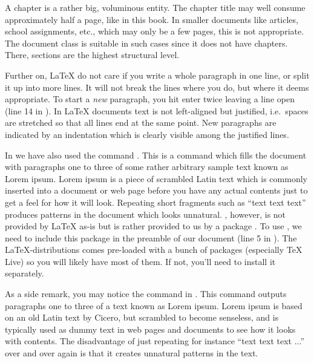 \begin{listing}
	\inputminted{latex}{latex/structure.tex}
	\caption{A \LaTeX{} document with some structure and text}
	\label{lst:latex:structure}
\end{listing}

A chapter is a rather big, voluminous entity. The chapter title may well consume approximately half a page, like in this book. In smaller documents like articles, school assignments, etc., which may only be a few pages, this is not appropriate. The   document class is suitable in such cases since it does not have chapters. There, sections are the highest structural level.

Further on, \LaTeX{} do not care if you write a whole paragraph in one line, or split it up into more lines. It will not break the lines where you do, but where it deems appropriate. To start a \emph{new} paragraph, you hit enter twice leaving a line open (line 14 in ). In \LaTeX{} documents text is not left-aligned but justified, i.e.\ spaces are stretched so that all lines end at the same point. New paragraphs are indicated by an indentation which is clearly visible among the justified lines.

In  we have also used the command \latexin{\lipsum[1-3]}. This is a command which fills the document with paragraphs one to three of some rather arbitrary sample text known as Lorem ipsum. Lorem ipsum is a piece of scrambled Latin text which is commonly inserted into a document or web page before you have any actual contents just to get a feel for how it will look. Repeating short fragments such as ``text text text'' produces patterns in the document which looks unnatural. \latexin{\lipsum}, however, is not provided by \LaTeX{} as-is but is rather provided to us by a package . To use \latexin{\lipsum}, we need to include this package in the preamble of our document (line 5 in ). The \LaTeX{}-distributions comes pre-loaded with a bunch of packages (especially TeX Live) so you will likely have most of them. If not, you'll need to install it separately.

As a side remark, you may notice the \latexin{\lipsum[1-3]} command in . This command outputs paragraphs one to three of a text known as Lorem ipsum. Lorem ipsum is based on an old Latin text by Cicero, but scrambled to become senseless, and is typically used as dummy text in web pages and documents to see how it looks with contents. The disadvantage of just repeating for instance ``text text text ...'' over and over again is that it creates unnatural patterns in the text.

